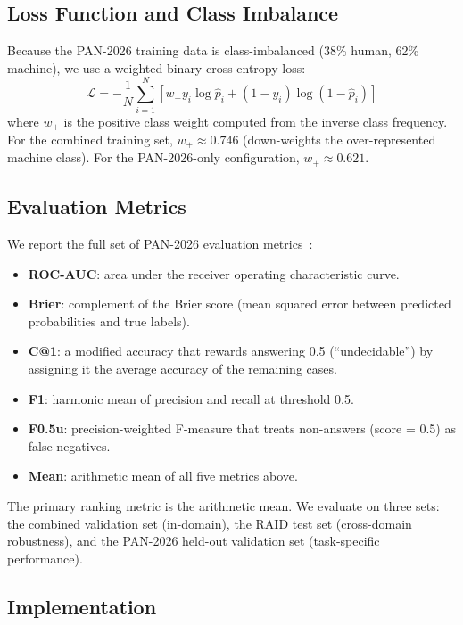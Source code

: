 \documentclass[]{ceurart}
\begin{document}
\subsection{Loss Function and Class Imbalance}

Because the PAN-2026 training data is class-imbalanced (38\% human, 62\% machine), we use a weighted binary cross-entropy loss:
\begin{equation}
  \mathcal{L} = -\frac{1}{N}\sum_{i=1}^{N}\left[w_+ y_i \log \hat{p}_i + (1-y_i)\log(1-\hat{p}_i)\right]
\end{equation}
where $w_+$ is the positive class weight computed from the inverse class frequency. For the combined training set, $w_+ \approx 0.746$ (down-weights the over-represented machine class). For the PAN-2026-only configuration, $w_+\approx 0.621$.

\subsection{Evaluation Metrics}

We report the full set of PAN-2026 evaluation metrics~\cite{bevendorff:2025}:
\begin{itemize}
  \item \textbf{ROC-AUC}: area under the receiver operating characteristic curve.
  \item \textbf{Brier}: complement of the Brier score (mean squared error between predicted probabilities and true labels).
  \item \textbf{C@1}: a modified accuracy that rewards answering 0.5 (``undecidable'') by assigning it the average accuracy of the remaining cases.
  \item \textbf{F1}: harmonic mean of precision and recall at threshold 0.5.
  \item \textbf{F0.5u}: precision-weighted F-measure that treats non-answers (score = 0.5) as false negatives.
  \item \textbf{Mean}: arithmetic mean of all five metrics above.
\end{itemize}
The primary ranking metric is the arithmetic mean. We evaluate on three sets: the combined validation set (in-domain), the RAID test set (cross-domain robustness), and the PAN-2026 held-out validation set (task-specific performance).

\subsection{Implementation}
\end{document}
